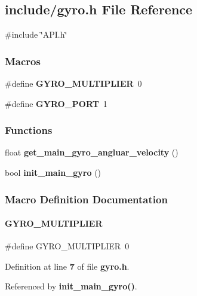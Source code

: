 \subsection{include/gyro.h File Reference}
\label{a00020}
{\ttfamily \#include \char`\"{}A\+P\+I.\+h\char`\"{}}\newline
\subsubsection*{Macros}
\begin{DoxyCompactItemize}
\item 
\#define \textbf{ G\+Y\+R\+O\+\_\+\+M\+U\+L\+T\+I\+P\+L\+I\+ER}~0
\item 
\#define \textbf{ G\+Y\+R\+O\+\_\+\+P\+O\+RT}~1
\end{DoxyCompactItemize}
\subsubsection*{Functions}
\begin{DoxyCompactItemize}
\item 
float \textbf{ get\+\_\+main\+\_\+gyro\+\_\+angluar\+\_\+velocity} ()
\item 
bool \textbf{ init\+\_\+main\+\_\+gyro} ()
\end{DoxyCompactItemize}


\subsubsection{Macro Definition Documentation}
\mbox{\label{a00020_a482017cc25be9213fef3222112eb1c7f}} 
\paragraph{G\+Y\+R\+O\+\_\+\+M\+U\+L\+T\+I\+P\+L\+I\+ER}
{\footnotesize\ttfamily \#define G\+Y\+R\+O\+\_\+\+M\+U\+L\+T\+I\+P\+L\+I\+ER~0}



Definition at line \textbf{ 7} of file \textbf{ gyro.\+h}.



Referenced by \textbf{ init\+\_\+main\+\_\+gyro()}.

\mbox{\label{a00020_a51d281e7676749d34aab3f8ba6fab960}} 
